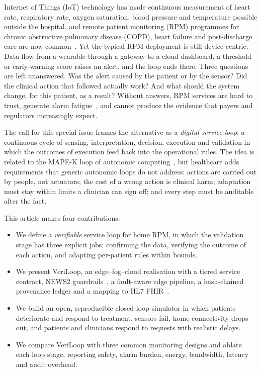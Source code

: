\documentclass[journal]{IEEEtran}
\begin{document}
Internet of Things (IoT) technology has made continuous measurement of heart rate, respiratory rate, oxygen saturation,
blood pressure and temperature possible outside the hospital, and remote patient monitoring (RPM) programmes for chronic
obstructive pulmonary disease (COPD), heart failure and post-discharge care are now common~\cite{islam2015,farahani2018}.
Yet the typical RPM deployment is still device-centric. Data flow from a wearable through a gateway to a cloud
dashboard, a threshold or early-warning score raises an alert, and the loop ends there. Three questions are left
unanswered. Was the alert caused by the patient or by the sensor? Did the clinical action that followed actually work?
And what should the system change, for this patient, as a result? Without answers, RPM services are hard to trust,
generate alarm fatigue~\cite{sendelbach2013}, and cannot produce the evidence that payers and regulators increasingly
expect.

The call for this special issue frames the alternative as a \emph{digital service loop}: a continuous cycle of sensing,
interpretation, decision, execution and validation in which the outcomes of execution feed back into the operational
rules. The idea is related to the MAPE-K loop of autonomic computing~\cite{kephart2003}, but healthcare adds
requirements that generic autonomic loops do not address: actions are carried out by people, not actuators; the cost of
a wrong action is clinical harm; adaptation must stay within limits a clinician can sign off; and every step must be
auditable after the fact.

This article makes four contributions.
\begin{itemize}
\item We define a \emph{verifiable} service loop for home RPM, in which the validation stage has three explicit jobs:
confirming the data, verifying the outcome of each action, and adapting per-patient rules within bounds.
\item We present VeriLoop, an edge--fog--cloud realisation with a tiered service contract, NEWS2
guardrails~\cite{rcp2017}, a fault-aware edge pipeline, a hash-chained provenance ledger and a mapping to HL7
FHIR~\cite{fhir}.
\item We build an open, reproducible closed-loop simulator in which patients deteriorate and respond to treatment,
sensors fail, home connectivity drops out, and patients and clinicians respond to requests with realistic delays.
\item We compare VeriLoop with three common monitoring designs and ablate each loop stage, reporting safety, alarm
burden, energy, bandwidth, latency and audit overhead.
\end{itemize}
\end{document}
